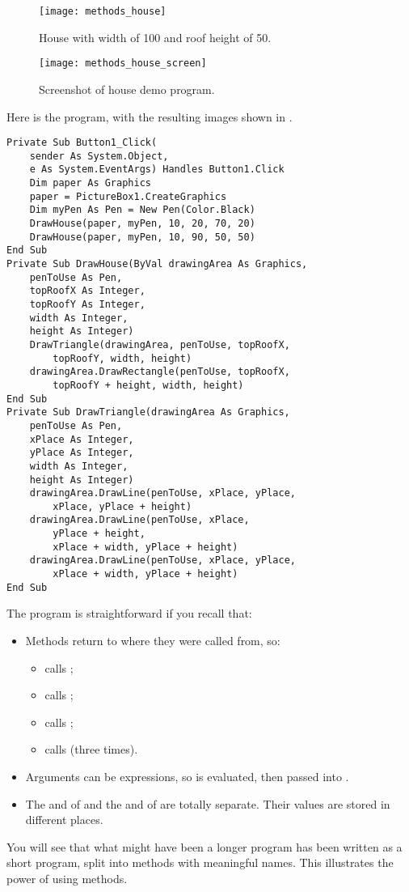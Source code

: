 		\begin{figure}[ht]
			\centering
			\texttt{[image: methods\_house]}
			\caption{House with width of 100 and roof height of 50.}
			\label{fig:methods_house}
		\end{figure}

		\begin{figure}[ht]
			\centering
			\texttt{[image: methods\_house\_screen]}
			\caption{Screenshot of house demo program.}
			\label{fig:methods_house_screen}
		\end{figure}

		
		Here is the program, with the resulting images shown in .
		\begin{lstlisting}
Private Sub Button1_Click(
	sender As System.Object,
	e As System.EventArgs) Handles Button1.Click
	Dim paper As Graphics
	paper = PictureBox1.CreateGraphics
	Dim myPen As Pen = New Pen(Color.Black)
	DrawHouse(paper, myPen, 10, 20, 70, 20)
	DrawHouse(paper, myPen, 10, 90, 50, 50)
End Sub
Private Sub DrawHouse(ByVal drawingArea As Graphics,
	penToUse As Pen,
	topRoofX As Integer,
	topRoofY As Integer,
	width As Integer,
	height As Integer)
	DrawTriangle(drawingArea, penToUse, topRoofX,
		topRoofY, width, height)
	drawingArea.DrawRectangle(penToUse, topRoofX,
		topRoofY + height, width, height)
End Sub
Private Sub DrawTriangle(drawingArea As Graphics,
	penToUse As Pen,
	xPlace As Integer,
	yPlace As Integer,
	width As Integer,
	height As Integer)
	drawingArea.DrawLine(penToUse, xPlace, yPlace,
		xPlace, yPlace + height)
	drawingArea.DrawLine(penToUse, xPlace,
		yPlace + height,
		xPlace + width, yPlace + height)
	drawingArea.DrawLine(penToUse, xPlace, yPlace,
		xPlace + width, yPlace + height)
End Sub
		\end{lstlisting}
		The program is straightforward if you recall that:
		\begin{itemize}
			\item Methods return to where they were called from, so:
				\begin{itemize}
					\item {} calls ;
					\item {} calls ;
					\item {} calls ;
					\item {} calls  (three times).
				\end{itemize}
			\item Arguments can be expressions, so  is evaluated, then passed into .
			\item The  and  of  and the  and  of  are totally separate. Their values are stored in different places.
		\end{itemize}
		You will see that what might have been a longer program has been written as a short program, split into methods with meaningful names. This illustrates the power of using methods.


